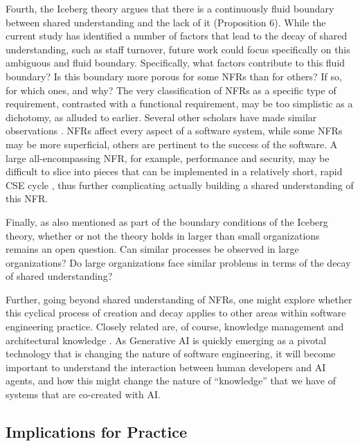 \documentclass[smallextended]{svjour3}       %
\begin{document}
Fourth, the Iceberg theory argues that there is a continuously fluid boundary between shared understanding and the lack of it (Proposition 6). While the current study has identified a number of factors that lead to the decay of shared understanding, such as staff turnover, future work could focus specifically on this ambiguous and fluid boundary. Specifically, what factors contribute to this fluid boundary? Is this boundary more porous for some NFRs than for others? If so, for which ones, and why? The very classification of NFRs as a specific type of requirement, contrasted with a functional requirement, may be too simplistic as a dichotomy, as alluded to earlier. Several other scholars have made similar observations \citep{glinz_non-functional_2007,eckhardt2016non}.  
NFRs affect every aspect of a software system, while some NFRs may be more superficial, others are pertinent to the success of the software.
A large all-encompassing NFR, for example, performance and security, may be difficult to slice into pieces that can be implemented in a relatively short, rapid CSE cycle \citep{bellomo_evolutionary_2014}, thus further complicating actually building a shared understanding of this NFR.



Finally, as also mentioned as part of the boundary conditions of the Iceberg theory, whether or not the theory holds in larger than small organizations remains an open question. Can similar processes be observed in large organizations? Do large organizations face similar problems in terms of the decay of shared understanding?

Further, going beyond shared understanding of NFRs, one might explore whether this cyclical process of creation and decay applies to other areas within software engineering practice. Closely related are, of course, knowledge management \citep{bjornson2008knowledge} and architectural knowledge \citep{capilla2016}. As Generative AI is quickly emerging as a pivotal technology that is changing the nature of software engineering, it will become important to understand the interaction between human developers and AI agents, and how this might change the nature of ``knowledge'' that we have of systems that are co-created with AI. 


\subsection{Implications for Practice}
\label{sec:practical}
\end{document}
